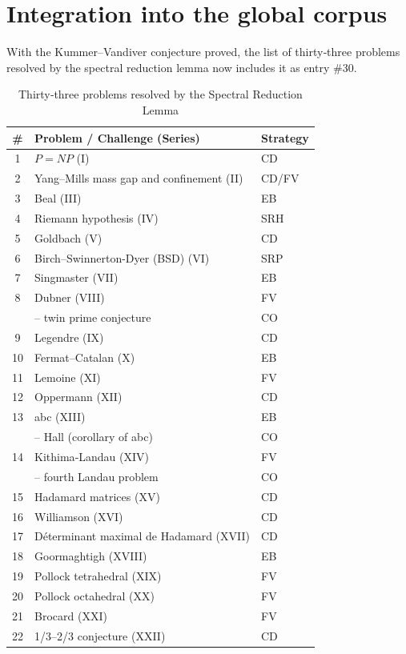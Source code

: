 \documentclass[11pt,a4paper]{article}
\begin{document}
\section{Integration into the global corpus}

With the Kummer–Vandiver conjecture proved, the list of thirty‑three problems resolved by the spectral reduction lemma now includes it as entry \#30.

\begin{center}
\small
\begin{longtable}{@{}cll@{}}
\caption{Thirty‑three problems resolved by the Spectral Reduction Lemma}\\
\toprule
\# & Problem / Challenge (Series) & Strategy \\
\midrule
1 & \(P = NP\) (I) & CD \\
2 & Yang–Mills mass gap and confinement (II) & CD/FV \\
3 & Beal (III) & EB \\
4 & Riemann hypothesis (IV) & SRH \\
5 & Goldbach (V) & CD \\
6 & Birch–Swinnerton-Dyer (BSD) (VI) & SRP \\
7 & Singmaster (VII) & EB \\
8 & Dubner (VIII) & FV \\
   & \quad – twin prime conjecture & CO \\
9 & Legendre (IX) & CD \\
10 & Fermat–Catalan (X) & EB \\
11 & Lemoine (XI) & FV \\
12 & Oppermann (XII) & CD \\
13 & abc (XIII) & EB \\
   & \quad – Hall (corollary of abc) & CO \\
14 & Kithima‑Landau (XIV) & FV \\
    & \quad – fourth Landau problem & CO \\
15 & Hadamard matrices (XV) & CD \\
16 & Williamson (XVI) & CD \\
17 & Déterminant maximal de Hadamard (XVII) & CD \\
18 & Goormaghtigh (XVIII) & EB \\
19 & Pollock tetrahedral (XIX) & FV \\
20 & Pollock octahedral (XX) & FV \\
21 & Brocard (XXI) & FV \\
22 & 1/3–2/3 conjecture (XXII) & CD \\

\end{longtable}
\end{center}
\end{document}
